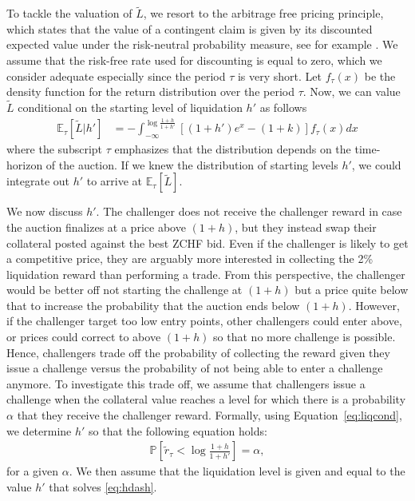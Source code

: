 \documentclass[english,11pt]{article}
\begin{document}
To tackle the valuation of $\tilde{L}$, we resort to the arbitrage free pricing principle,
which states that the value of a contingent claim is given by
its discounted expected value under the risk-neutral probability measure,
see for example \cite{bjork2009arbitrage}.
We assume that the risk-free rate used for discounting is equal to zero,
which we consider adequate especially since the period $\tau$ is very short.
Let $f_{\tau}(x)$ be the density function for the return distribution over the period $\tau$. Now, we can value $\tilde{L}$ conditional
on the starting level of liquidation $h'$ as follows
\begin{align}
\mathbb{E}_{\tau}\left[\tilde{L} \vert h' \right]  &= - \int_{-\infty}^{\log \frac{1+h}{1+h'}} \left[(1 + h') e^{x} - (1+k) \right] f_{\tau}(x) dx\label{eq:E}
\end{align}
where the subscript $\tau$ emphasizes that the distribution depends on the time-horizon of the auction.
If we knew the distribution of starting levels $h'$, we could integrate out $h'$ to arrive at $\mathbb{E}_{\tau}[\tilde{L}]$.

We now discuss $h'$. The challenger does not receive the challenger reward in case the auction finalizes at a price above $(1+h)$, but 
they instead swap their collateral posted against the best ZCHF bid. Even if the challenger is likely to
get a competitive price, they are arguably more interested in collecting the 2\% liquidation 
reward than performing a trade. From this perspective, the challenger would be better off not starting the challenge
at $(1+h)$ but a price quite below that to increase the probability that the auction ends below $(1+h)$. However,
if the challenger target too low entry points, other challengers could enter above, or prices could correct to above $(1+h)$
so that no more challenge is possible.
Hence, challengers trade off the probability of collecting the reward given they issue a challenge versus the probability of not being able to enter
a challenge anymore. To investigate this trade off, we assume that challengers issue a challenge when the collateral value
reaches a level for which there is a probability $\alpha$ that they receive the challenger reward. Formally, using
Equation~\eqref{eq:liqcond}, we determine
$h'$ so that the following equation holds:
\begin{align}
	\mathbb{P}\left[\tilde{r}_{\tau}<\log \frac{1+h}{1+h'}\right] = \alpha,\label{eq:hdash}
\end{align}
for a given $\alpha$. We then assume that the liquidation level is given and equal to the value $h'$ that solves \eqref{eq:hdash}.
\end{document}
